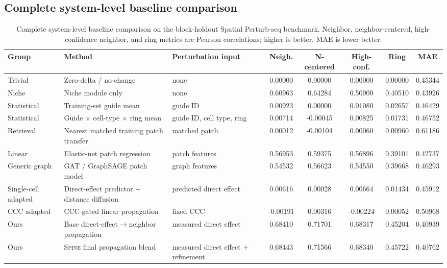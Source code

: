 \documentclass[sigconf,anonymous,review]{acmart}
\newcommand{\methodname}{\textsc{Spine}\xspace}
\begin{document}
\subsection{Complete system-level baseline comparison}
\label{app:full_baseline_comparison}

\begin{table}[t]
\centering
\caption{Complete system-level baseline comparison on the block-holdout Spatial Perturb-seq benchmark. Neighbor, neighbor-centered, high-confidence neighbor, and ring metrics are Pearson correlations; higher is better. MAE is lower better.}
\label{tab:app_full_baseline_comparison}
\scriptsize
\setlength{\tabcolsep}{3pt}
\renewcommand{\arraystretch}{1.12}
\begin{tabularx}{\textwidth}{@{}>{\raggedright\arraybackslash}p{}
>{\raggedright\arraybackslash}X
>{\raggedright\arraybackslash}p{}
ccccc@{}}
\toprule
Group & Method & Perturbation input & Neigh. & N-centered & High-conf. & Ring & MAE \\
\midrule
Trivial &
Zero-delta / no-change &
none &
0.00000 & 0.00000 & 0.00000 & 0.00000 & 0.45344 \\

Niche &
Niche module only &
none &
0.60963 & 0.64284 & 0.50900 & 0.40510 & 0.43926 \\

Statistical &
Training-set guide mean &
guide ID &
0.00923 & 0.00000 & 0.01080 & 0.02657 & 0.46429 \\

Statistical &
Guide $\times$ cell-type $\times$ ring mean &
guide ID, cell type, ring &
0.00714 & -0.00045 & 0.00825 & 0.01731 & 0.46752 \\

Retrieval &
Nearest matched training patch transfer &
matched patch &
0.00012 & -0.00104 & 0.00060 & 0.00960 & 0.61186 \\

Linear &
Elastic-net patch regression &
patch features &
0.56953 & 0.59375 & 0.56896 & 0.39101 & 0.42737 \\

Generic graph &
GAT / GraphSAGE patch model &
graph features &
0.54532 & 0.56623 & 0.54550 & 0.39668 & 0.46293 \\

Single-cell adapted &
Direct-effect predictor + distance diffusion &
predicted direct effect &
0.00616 & 0.00028 & 0.00664 & 0.01434 & 0.45912 \\

CCC adapted &
CCC-gated linear propagation &
fixed CCC &
-0.00191 & 0.00316 & -0.00224 & 0.00052 & 0.50968 \\

Ours &
Base direct-effect$\rightarrow$neighbor propagation &
measured direct effect &
0.68410 & 0.71701 & 0.68317 & 0.45204 & 0.40939 \\

\rowcolor{blue!7}
Ours &
\methodname{} final propagation blend &
measured direct effect + refinement &
0.68443 & 0.71566 & 0.68340 & 0.45722 & 0.40762 \\
\bottomrule
\end{tabularx}
\end{table}
\end{document}
